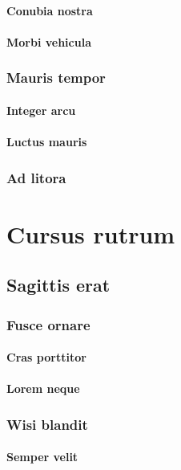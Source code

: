 \subsubsection{Conubia nostra} \lipsum[16]
\subsubsection{Morbi vehicula} \lipsum[17]
\subsection{Mauris tempor} \lipsum [18]
\subsubsection{Integer arcu} \lipsum[19]
\subsubsection{Luctus mauris} \lipsum[20]
\subsection{Ad litora} \lipsum [21-22]



\chapter{Cursus rutrum}

 \lipsum[1-2]

\section{Sagittis erat} \lipsum[3-4]
\subsection{Fusce ornare} \lipsum[5]
\subsubsection{Cras porttitor} \lipsum[6]
\subsubsection{Lorem neque} \lipsum[7]
\subsection{Wisi blandit} \lipsum[8]
\subsubsection{Semper velit} \lipsum[9]

